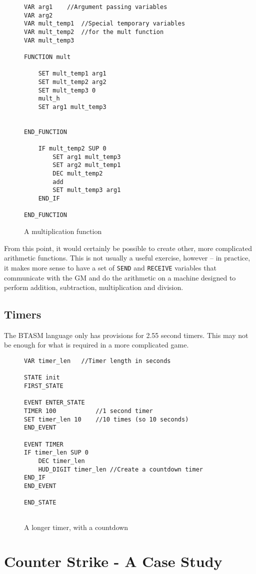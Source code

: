 \documentclass[12pt,a4paper]{scrbook}
\begin{document}
\begin{figure}[h]
\begin{lstlisting}
VAR arg1	//Argument passing variables
VAR arg2
VAR mult_temp1	//Special temporary variables
VAR mult_temp2	//for the mult function
VAR mult_temp3

FUNCTION mult

	SET mult_temp1 arg1
	SET mult_temp2 arg2
	SET mult_temp3 0
	mult_h
	SET arg1 mult_temp3
	
	
END_FUNCTION
	
	IF mult_temp2 SUP 0
		SET arg1 mult_temp3
		SET arg2 mult_temp1
		DEC mult_temp2
		add
		SET mult_temp3 arg1
	END_IF
	
END_FUNCTION
\end{lstlisting}
\caption{A multiplication function} 
\end{figure}

From this point, it would certainly be possible to create other, more complicated arithmetic
functions.  This is not usually a useful exercise, however -- in practice, it makes more sense to
have a set of \texttt{SEND} and \texttt{RECEIVE} variables that communicate with the GM and do
the arithmetic on a machine designed to perform addition, subtraction, multiplication and division.

\section{Timers}
The BTASM language only has provisions for 2.55 second timers.  This may not be enough for what is
required in a more complicated game.  


\begin{figure}[h]
\begin{lstlisting}
VAR timer_len	//Timer length in seconds

STATE init
FIRST_STATE

EVENT ENTER_STATE
TIMER 100			//1 second timer
SET timer_len 10	//10 times (so 10 seconds)
END_EVENT

EVENT TIMER
IF timer_len SUP 0
	DEC timer_len
	HUD_DIGIT timer_len //Create a countdown timer
END_IF
END_EVENT

END_STATE
	
\end{lstlisting}
\caption{A longer timer, with a countdown} 
\end{figure}

\chapter{Counter Strike - A Case Study}
\end{document}
